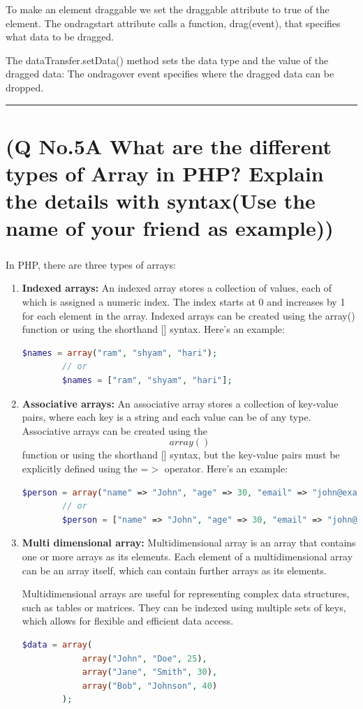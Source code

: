 \documentclass[11pt]{article}
\begin{document}

To make an element draggable we set the draggable attribute to true of the element.
The ondragstart attribute calls a function, drag(event), that specifies what data to be dragged.

The dataTransfer.setData() method sets the data type and the value of the dragged data:
The ondragover event specifies where the dragged data can be dropped.


\noindent\rule{\linewidth}{0.4pt}
\section{(Q No.5A What are the different types of Array in PHP? Explain the details with syntax(Use the name of your friend as example)) }
\subparagraph{}
In PHP, there are three types of arrays:
\begin{enumerate}
    \item \textbf{Indexed arrays:}
    An indexed array stores a collection of values, each of which is assigned a numeric index. The index starts at 0 and increases by 1 for each element in the array. Indexed arrays can be created using the array() function or using the shorthand [] syntax. Here's an example:
    \begin{lstlisting}[language=php]
        $names = array("ram", "shyam", "hari");
        // or
        $names = ["ram", "shyam", "hari"];
    \end{lstlisting}

    \item \textbf{Associative arrays:}
    An associative array stores a collection of key-value pairs, where each key is a string and each value can be of any type. Associative arrays can be created using the \[array()\] function or using the shorthand [] syntax, but the key-value pairs must be explicitly defined using the =$>$ operator. Here's an example:
    \begin{lstlisting}[language=php]
        $person = array("name" => "John", "age" => 30, "email" => "john@example.com");
        // or
        $person = ["name" => "John", "age" => 30, "email" => "john@example.com"];

    \end{lstlisting}

    \item \textbf{Multi dimensional array:}
    Multidimensional array is an array that contains one or more arrays as its elements. Each element of a multidimensional array can be an array itself, which can contain further arrays as its elements.

    Multidimensional arrays are useful for representing complex data structures, such as tables or matrices. They can be indexed using multiple sets of keys, which allows for flexible and efficient data access.
    \begin{lstlisting}[language=php]
        $data = array(
            array("John", "Doe", 25),
            array("Jane", "Smith", 30),
            array("Bob", "Johnson", 40)
        );
    \end{lstlisting}
\end{enumerate}
\end{document}
